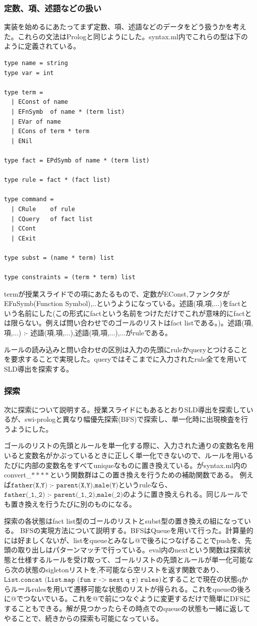 \documentclass[11pt,a4paper]{jsarticle}
\begin{document}
\subsubsection*{定数、項、述語などの扱い}
実装を始めるにあたってまず定数、項、述語などのデータをどう扱うかを考えた。これらの文法はPrologと同じようにした。syntax.ml内でこれらの型は下のように定義されている。
\begin{lstlisting}[basicstyle=\ttfamily\footnotesize, frame=single]
type name = string 
type var = int

type term =
  | EConst of name
  | EFnSymb  of name * (term list)
  | EVar of name
  | ECons of term * term
  | ENil

type fact = EPdSymb of name * (term list)

type rule = fact * (fact list)

type command =
  | CRule    of rule
  | CQuery   of fact list
  | CCont
  | CExit

type subst = (name * term) list

type constraints = (term * term) list
\end{lstlisting}
termが授業スライドでの項にあたるもので、定数がEConst,ファンクタがEFnSymb(Function Symbol),..というようになっている。述語(項,項,...)をfactという名前にした(この形式にfactという名前をつけただけでこれが意味的にfactとは限らない。例えば問い合わせでのゴールのリストはfact listである。)。述語(項,項,...) :- 述語(項,項,...),述語(項,項,...),...がruleである。\par
ルールの読み込みと問い合わせの区別は入力の先頭にruleかqueryとつけることを要求することで実現した。queryではそこまでに入力されたrule全てを用いてSLD導出を探索する。
\subsubsection*{探索}
次に探索について説明する。授業スライドにもあるとおりSLD導出を探索しているが、swi-prologと異なり幅優先探索(BFS)で探索し、単一化時に出現検査を行うようにした。\par
ゴールのリストの先頭とルールを単一化する際に、入力された通りの変数名を用いると変数名がかぶっているときに正しく単一化できないので、ルールを用いるたびに内部の変数名をすべてuniqueなものに置き換えている。がsyntax.ml内のconvert\_$****$という関数群はこの置き換えを行うための補助関数である。
例えば$\texttt{father(X,Y) :- parent(X,Y),male(Y)}$というruleなら、$\texttt{father(\_1,\_2) :- parent(\_1,\_2),male(\_2)}$のように置き換えられる。同じルールでも置き換えを行うたびに別のものになる。\par
探索の各状態はfact list型のゴールのリストとsubst型の置き換えの組になっている。
BFSの実現方法について説明する。BFSはQueueを用いて行った。計算量的には好ましくないが、listをqueueとみなし@で後ろにつなげることでpushを、先頭の取り出しはパターンマッチで行っている。eval内のnextという関数は探索状態と仕様するルールを受け取って、ゴールリストの先頭とルールが単一化可能なら次の状態のsigletonリストを,不可能なら空リストを返す関数であり、$\texttt{List.concat (List.map (fun r -> next q r) rules)}$とすることで現在の状態qからルールrulesを用いて遷移可能な状態のリストが得られる。これをqueueの後ろに@でつないでいる。これを@で前につなぐように変更するだけで簡単にDFSにすることもできる。解が見つかったらその時点でのqueueの状態も一緒に返してやることで、続きからの探索も可能になっている。
\end{document}
